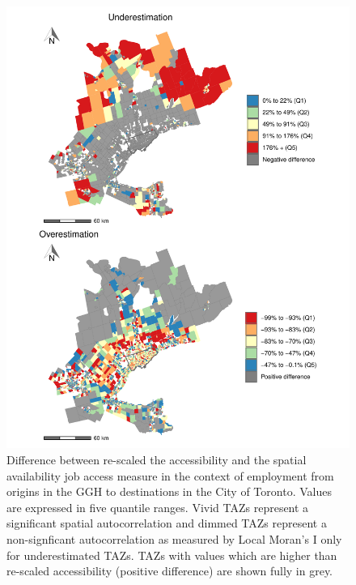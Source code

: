 \documentclass[]{elsarticle} %
\begin{document}
\begin{figure}
\includegraphics[width=1\linewidth]{Spatial-Availability_files/figure-latex/plot-difference-GGH-1} \caption{\label{fig:plot-difference-GGH}Difference between re-scaled the accessibility and the spatial availability job access measure in the context of employment from origins in the GGH to destinations in the City of Toronto. Values are expressed in five quantile ranges. Vivid TAZs represent a significant spatial autocorrelation and dimmed TAZs represent a non-signficant autocorrelation as measured by Local Moran's I only for underestimated TAZs. TAZs with values which are higher than re-scaled accessibility (positive difference) are shown fully in grey.}\label{fig:plot-difference-GGH}
\end{figure}
\end{document}
